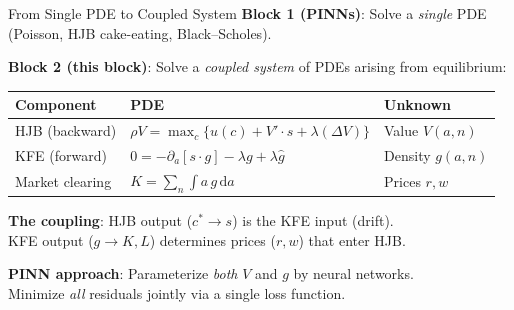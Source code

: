 \documentclass[aspectratio=169,11pt]{beamer}
\newcommand{\emphc}[1]{\textcolor{harvardcrimson}{#1}}
\newcommand{\ud}{\,\mathrm{d}}
\begin{document}
\begin{frame}{From Single PDE to Coupled System}
\small
\textbf{Block 1 (PINNs)}: Solve a \emph{single} PDE (Poisson, HJB cake-eating, Black--Scholes).

\vspace{0.2em}
\textbf{Block 2 (this block)}: Solve a \emph{coupled system} of PDEs arising from equilibrium:

\vspace{0.2em}
\begin{center}
\small
\renewcommand{\arraystretch}{1.3}
\begin{tabular}{lll}
\toprule
\textbf{Component} & \textbf{PDE} & \textbf{Unknown} \\
\midrule
HJB (backward) & $\rho V = \max_c\{u(c) + V'\cdot s + \lambda(\Delta V)\}$ & Value $V(a,n)$ \\
KFE (forward) & $0 = -\partial_a[s\cdot g] - \lambda g + \lambda\hat{g}$ & Density $g(a,n)$ \\
Market clearing & $K = \sum_n \int a\,g\ud a$ & Prices $r, w$ \\
\bottomrule
\end{tabular}
\end{center}

\vspace{0.2em}
\textbf{The coupling}: HJB output ($c^* \to s$) is the KFE input (drift).\\
KFE output ($g \to K, L$) determines prices ($r, w$) that enter HJB.

\vspace{0.2em}
\begin{center}
\colorbox{uzhgreylight}{\parbox{0.7\textwidth}{\centering\small
\textbf{PINN approach}: Parameterize \emph{both} $V$ and $g$ by neural networks.\\
Minimize \emph{all} residuals \emphc{jointly} via a single loss function.}}
\end{center}
\end{frame}
\end{document}
